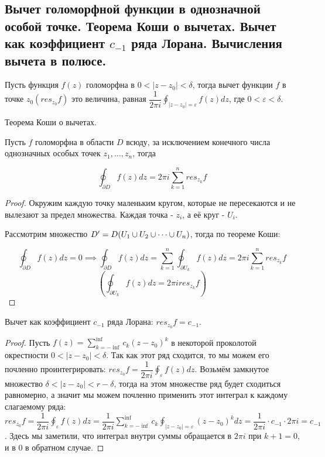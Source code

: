 \subsection{Вычет голоморфной функции в однозначной особой точке. Теорема Коши о вычетах. Вычет как коэффициент $c_{-1}$ ряда Лорана. Вычисления вычета в полюсе.}

\begin{definition}
	Пусть функция $f(z)$ голоморфна в $0 < |z - z_0| < \delta$, тогда вычет функции $f$ в точке $z_0(res_{z_0}f)$ это величина, равная $\dfrac{1}{2\pi i} \oint_{|z - z_0| = \varepsilon} f(z)dz$, где $0 < \varepsilon < \delta$.
\end{definition}

\begin{theorem}
	Теорема Коши о вычетах.
	
	Пусть $f$ голоморфна в области $D$ всюду, за исключением конечного числа однозначных особых точек $z_1, \dots, z_n$, тогда
	
	$$\oint_{\partial D} f(z)dz = 2\pi i \sum_{k = 1}^{n} res_{z_k}f$$
\end{theorem}

\begin{proof}
	Окружим каждую точку маленьким кругом, которые не пересекаются и не вылезают за предел множества. Каждая точка - $z_i$, а её круг - $U_i$.
	
	Рассмотрим множество $D' = D \\ (U_1 \cup U_2 \cup \dots \cup U_n)$, тогда по теореме Коши: 
	
	$$\oint_{\partial D} f(z)dz = 0 \implies \oint_{\partial D} f(z)dz = \sum_{k=1}^{n} \oint_{\partial U_k} f(z)dz = 2\pi i \sum_{k = 1}^{n} res_{z_k}f$$ $$(\oint_{\partial U_k} f(z)dz = 2\pi i res_{z_k}f )$$
\end{proof}

\begin{theorem}
	Вычет как коэффициент $c_{-1}$ ряда Лорана: $res_{z_0}f = c_{-1}$.
\end{theorem}

\begin{proof}
	Пусть $f(z) = \sum_{k = -\inf}^{\inf} c_k(z-z_0)^k$ в некоторой проколотой окрестности $0 < |z - z_0| < \delta$. Так как этот ряд
	сходится, то мы можем его почленно проинтегрировать: $res_{z_0}f = \dfrac{1}{2\pi i} \oint_{\varepsilon} f(z) dz$. Возьмём замкнутое множество $\delta < |z - z_0| < r - \delta$, тогда на этом множестве ряд будет сходиться равномерно, а значит мы можем почленно применить этот интеграл к каждому слагаемому ряда: $res_{z_0}f = \dfrac{1}{2\pi i} \oint_{\varepsilon} f(z)dz = \dfrac{1}{2\pi i} \sum_{k = -\inf}^{\inf} c_k \oint_{|z - z_0| = \varepsilon} (z - z_0)^k dz = \dfrac{1}{2\pi i} \cdot c_{-1} \cdot 2 \pi i = c_{-1}$. Здесь мы заметили, что интеграл внутри суммы обращается в $2\pi i$ при $k+1=0$, и в $0$ в обратном случае.
\end{proof}

